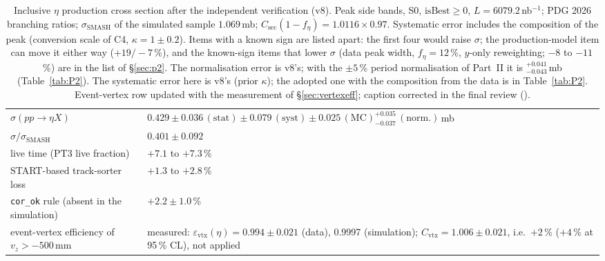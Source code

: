 \begin{table}[H]
\centering
\caption{Inclusive $\eta$ production cross section after the independent verification (v8). Peak side bands, S0, $\mathrm{isBest}\geq0$, $L=6079.2$\,nb$^{-1}$; PDG 2026 branching ratios; $\sigma_{\mathrm{SMASH}}$ of the simulated sample $1.069$\,mb; $C_{\mathrm{sec}}(1-f_\eta)=1.0116\times0.97$. Systematic error includes the composition of the peak (conversion scale of C4, $\kappa=1\pm0.2$). Items with a known sign are listed apart: the first four would raise $\sigma$; the production-model item can move it either way ($+19/-7$\,\%), and the known-sign items that lower $\sigma$ (data peak width, $f_\eta=12$\,\%, $y$-only reweighting; $-8$ to $-11$\,\%) are in the list of \S\ref{sec:p2}. The normalisation error is v8's; with the $\pm5$\,\% period normalisation of Part~II it is $^{+0.041}_{-0.043}$\,mb (Table~\ref{tab:P2}). The systematic error here is v8's (prior $\kappa$); the adopted one with the composition from the data is in Table~\ref{tab:P2}. Event-vertex row updated with the measurement of \S\ref{sec:vertexeff}; caption corrected in the final review ().}
\label{tab:v8sigma}
\small
\begin{tabular}{@{}p{} p{}@{}}
\toprule
$\sigma(pp\to\eta X)$ & $0.429\pm0.036\,(\mathrm{stat})\pm0.079\,(\mathrm{syst})\pm0.025\,(\mathrm{MC})^{+0.035}_{-0.037}\,(\mathrm{norm.})$\,mb \\
$\sigma/\sigma_{\mathrm{SMASH}}$ & $0.401\pm0.092$ \\
\midrule
live time (PT3 live fraction) & $+7.1$ to $+7.3$\,\% \\
START-based track-sorter loss & $+1.3$ to $+2.8$\,\% \\
\texttt{cor\_ok} rule (absent in the simulation) & $+2.2\pm1.0$\,\% \\
event-vertex efficiency of $v_z>-500$\,mm & measured: $\varepsilon_{\mathrm{vtx}}(\eta)=0.994\pm0.021$ (data), 0.9997 (simulation); $C_{\mathrm{vtx}}=1.006\pm0.021$, i.e.\ $+2$\,\% ($+4$\,\% at 95\,\% CL), not applied \\

\end{tabular}
\end{table}
